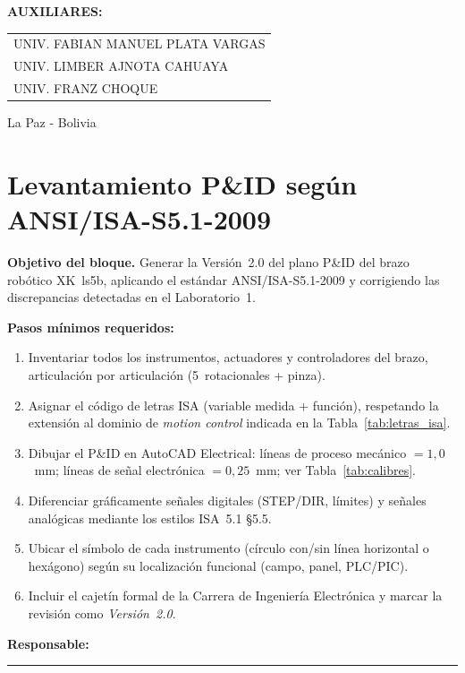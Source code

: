 \documentclass[11pt]{article}
\begin{document}
\begin{titlepage}
\begin{flushleft}
			\vspace{0.4cm}
			
			{\Large\bfseries AUXILIARES: \par}
			\vspace{0.2cm}
			{\large
				\begin{tabular}{l}
					UNIV. FABIAN MANUEL PLATA VARGAS\\
					UNIV. LIMBER AJNOTA CAHUAYA\\
					UNIV. FRANZ CHOQUE
				\end{tabular} \par}
		\end{flushleft}
		
		{\large 
			La Paz - Bolivia }
	\end{titlepage}
	\newpage
	
	\tableofcontents
	\newpage
	
\section{Levantamiento P\&ID según ANSI/ISA-S5.1-2009}
\label{sec:pid_brazo}

\begin{instrucciones}
	\textbf{Objetivo del bloque.} Generar la Versión~2.0 del plano P\&ID del brazo robótico XK~ls5b, aplicando el estándar ANSI/ISA-S5.1-2009 y corrigiendo las discrepancias detectadas en el Laboratorio~1.
	
	\textbf{Pasos mínimos requeridos:}
	\begin{enumerate}[leftmargin=*]
		\item Inventariar todos los instrumentos, actuadores y controladores del brazo, articulación por articulación (5~rotacionales + pinza).
		\item Asignar el código de letras ISA (variable medida + función), respetando la extensión al dominio de \emph{motion control} indicada en la Tabla~\ref{tab:letras_isa}.
		\item Dibujar el P\&ID en AutoCAD Electrical: líneas de proceso mecánico $=1{,}0$~mm; líneas de señal electrónica $=0{,}25$~mm; ver Tabla~\ref{tab:calibres}.
		\item Diferenciar gráficamente señales digitales (STEP/DIR, límites) y señales analógicas mediante los estilos ISA~5.1 §5.5.
		\item Ubicar el símbolo de cada instrumento (círculo con/sin línea horizontal o hexágono) según su localización funcional (campo, panel, PLC/PIC).
		\item Incluir el cajetín formal de la Carrera de Ingeniería Electrónica y marcar la revisión como \emph{Versión~2.0}.
	\end{enumerate}
	
	\textbf{Responsable:} \rule{6cm}{0.4pt}
\end{instrucciones}
\end{document}
